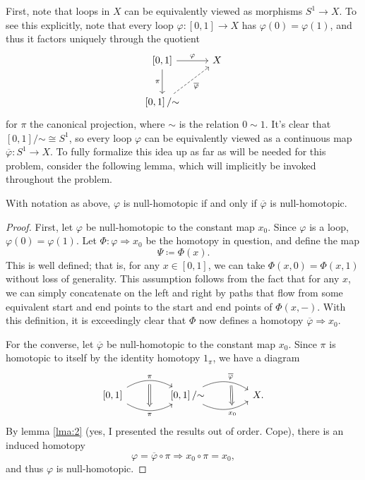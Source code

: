 \documentclass[11pt, letterpaper]{article}
\newcommand{\tildesim}{\mathbin{\sim}}
\begin{document}
First, note that loops in $X$ can be equivalently viewed as morphisms $S^1\to X$. To see this explicitly, note that every loop $\varphi : [0,1] \to X$ has $\varphi (0)=\varphi (1)$, and thus it factors uniquely through the quotient
\[\begin{tikzcd}[row sep = 2.5em, column sep = 2.5em]
\left[ 0,1 \right] \ar[" \varphi  ", r] \ar[" \pi  "', d]  & X \\
\left[ 0,1 \right] /\tildesim \ar[" \overline{\varphi }  "', dashed, ur]  & 
\end{tikzcd}\]
for $\pi $ the canonical projection, where $\sim $ is the relation $0\sim 1$. It's clear that $\left[ 0,1 \right] /\tildesim \cong S^1$, so every loop $\varphi $ can be equivalently viewed as a continuous map $\overline{\varphi } : S^1 \to X$. To fully formalize this idea up as far as will be needed for this problem, consider the following lemma, which will implicitly be invoked throughout the problem.
\begin{lemma}\label{lma:1}
	With notation as above, $\varphi $ is null-homotopic if and only if $\overline{\varphi } $ is null-homotopic.
\end{lemma}
\begin{proof}
	First, let $\varphi $ be null-homotopic to the constant map $x_0$. Since $\varphi $ is a loop, $\varphi (0)=\varphi (1)$. Let $\Phi : \varphi  \Rightarrow x_0$ be the homotopy in question, and define the map
	\[
		\Psi \coloneqq \Phi (x)
	.\]
	This is well defined; that is, for any $x\in[0,1]$, we can take $\Phi (x,0)=\Phi (x,1)$ without loss of generality. This assumption follows from the fact that for any $x$, we can simply concatenate on the left and right by paths that flow from some equivalent start and end points to the start and end points of $\Phi (x,-)$. With this definition, it is exceedingly clear that $\Phi $ now defines a homotopy $\overline{\varphi } \Rightarrow x_0$.

	For the converse, let $\overline{\varphi } $ be null-homotopic to the constant map $x_0$. Since $\pi $ is homotopic to itself by the identity homotopy $1_\pi $, we have a diagram
	\[\begin{tikzcd}[row sep = 4em, column sep = 4em]
		\left[ 0,1 \right] \ar[" \pi  "{name=p1}, bend left, r] \ar[" \pi  "'{name=p2}, bend right, r]  & \left[ 0,1 \right] /\tildesim \ar[" \overline{\varphi }  "{name=vp}, bend left, r] \ar[" x_0 "'{name=x0}, bend right, r]  & X.
		\arrow[from=p1, to=p2, Rightarrow, shorten=4px]
		\arrow[from=vp, to=x0, Rightarrow, shorten=4px]
	\end{tikzcd}\]
	By lemma \ref{lma:2} (yes, I presented the results out of order. Cope), there is an induced homotopy
	\[
		\varphi =\overline{\varphi } \circ \pi \Rightarrow x_0 \circ \pi =x_0,
	\]
	and thus $\varphi $ is null-homotopic.
\end{proof}
\end{document}
